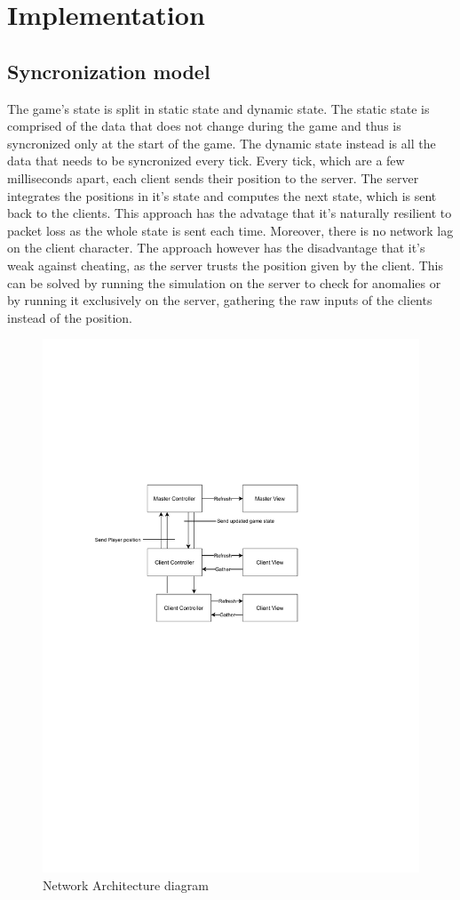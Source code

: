 \documentclass{article}
\begin{document}
\section{Implementation}

\subsection{Syncronization model}
The game's state is split in static state and dynamic state. The static state is comprised of the data that does not change during the game and thus is syncronized only at the start of the game. The dynamic state instead is all the data that needs to be syncronized every tick. 
Every tick, which are a few milliseconds apart, each client sends their position to the server. The server integrates the positions in it's state and computes the next state, which is sent back to the clients.
 This approach has the advatage that it's naturally resilient to packet loss as the whole state is sent each time. Moreover, there is no network lag on the client character.
 The approach however has the disadvantage that it's weak against cheating, as the server trusts the position given by the client. This can be solved by running the simulation on the server to check for anomalies or by running it exclusively on the server, gathering the raw inputs of the clients instead of the position.
\smallskip
\begin{figure}[H]
\includegraphics[width=\textwidth]{net architecture}
\caption{Network Architecture diagram}
\end{figure}
\end{document}
